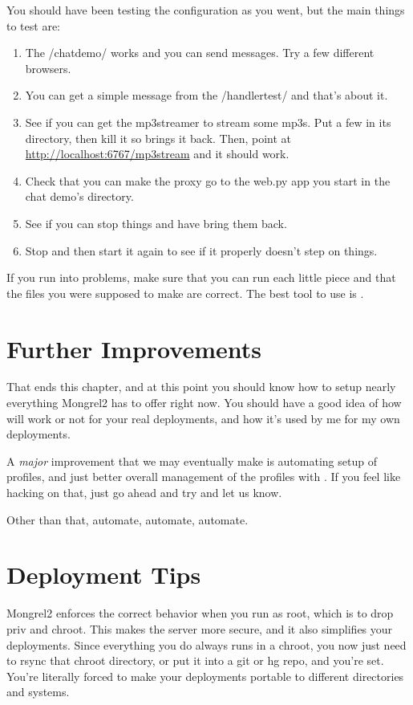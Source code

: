 You should have been testing the configuration as you went, but the
main things to test are:

\begin{enumerate}
\item The /chatdemo/ works and you can send messages. Try a few different
    browsers.
\item You can get a simple message from the /handlertest/ and that's about it.
\item See if you can get the mp3streamer to stream some mp3s.  Put a few
    in its directory, then kill it so  brings it back.  Then,
    point  at \url{http://localhost:6767/mp3stream} and
    it should work.
\item Check that you can make the proxy go to the web.py app you start
    in the chat demo's directory.
\item See if you can stop things and have  bring them back.
\item Stop  and then start it again to see if it properly
    doesn't step on things.
\end{enumerate}

If you run into problems, make sure that you can run each little
piece and that the files you were supposed to make are correct.
The best tool to use is .

\section{Further Improvements}

That ends this chapter, and at this point you should know how to setup
nearly everything Mongrel2 has to offer right now.  You should have a good
idea of how  will work or not for your real deployments, and
how it's used by me for my own deployments.

A \emph{major} improvement that we may eventually make is automating
setup of  profiles, and just better overall management
of the profiles with .  If you feel like hacking on that,
just go ahead and try and let us know.

Other than that, automate, automate, automate.

\section{Deployment Tips}

Mongrel2 enforces the correct behavior when you run as root, which is to drop priv and
chroot.  This makes the server more secure, and it also simplifies your deployments.
Since everything you do always runs in a chroot, you now just need to rsync that chroot
directory, or put it into a git or hg repo, and you're set.  You're literally forced to
make your deployments portable to different directories and systems.

